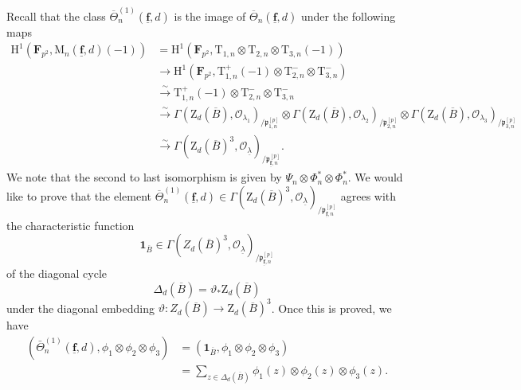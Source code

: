 \documentclass[10pt]{amsart}
\numberwithin{equation}{section}
\theoremstyle{plain}
\numberwithin{equation}{section}
\theoremstyle{definition}
\theoremstyle{remark}
\def\undlamb{\underline{\lambda}}
\def\triplef{\underline{\mathbf{f}}}
\def\triplepnp {{\frakp}^{[p]}_{\triplef, n}}
\def\calO{\mathcal{O}}
\def\frakp{\mathfrak{p}}
\def\FF{\mathbf{F}}
\def\rmH{\mathrm{H}}
\def\rmM{\mathrm{M}}
\def\rmT{\mathrm{T}}
\def\rmZ{\mathrm{Z}}
\begin{document}
Recall that the class  $\overline{\Theta}^{(1)}_{n}(\triplef, d)$ is the image of $\overline{\Theta}_{n}(\triplef, d)$ under the following maps 
\begin{equation*}
\begin{aligned}
\rmH^{1}(\FF_{p^{2}}, \rmM_{n}(\triplef, d)(-1))&= \rmH^{1}(\FF_{p^{2}}, \rmT_{1, n}\otimes\rmT_{2, n}\otimes \rmT_{3, n}(-1))\\
&\rightarrow\rmH^{1}(\FF_{p^{2}},\rmT^{+}_{1, n}(-1)\otimes \rmT^{-}_{2, n}\otimes\rmT^{-}_{3, n}) \\
&\xrightarrow{\sim} \rmT^{+}_{1, n}(-1)\otimes \rmT^{-}_{2, n}\otimes\rmT^{-}_{3, n} \\
&\xrightarrow{\sim}\Gamma(\rmZ_{d}(\overline{B}),\calO_{\lambda_{1}})_{/\frakp^{[p]}_{1, n}}\otimes \Gamma(\rmZ_{d}(\overline{B}),\calO_{\lambda_{2}})_{/\frakp^{[p]}_{2, n}}\otimes \Gamma(\rmZ_{d}(\overline{B}),\calO_{\lambda_{3}})_{/\frakp^{[p]}_{3, n}}\\
&\xrightarrow{\sim}\Gamma(\rmZ_{d}(\overline{B})^{3}, \calO_{\undlamb})_{/\triplepnp}.
\end{aligned}
\end{equation*}
We note that the second to last isomorphism is given by $\Psi_{n}\otimes\Phi^{\ast}_{n}\otimes\Phi^{\ast}_{n}$.
We would like to prove that the element $\overline{\Theta}^{(1)}_{n}(\triplef, d)\in \Gamma(\rmZ_{d}(\overline{B})^{3}, \calO_{\undlamb})_{/\frakp^{[p]}_{\triplef,n}}$ agrees with the characteristic function 
\begin{equation*}
\mathbf{1}_{\overline{B}}\in \Gamma(Z_{d}(\overline{B})^{3}, \calO_{\undlamb})_{/\triplepnp} 
\end{equation*}
of the diagonal cycle 
\begin{equation}\label{def-diagonal}
\Delta_{d}(\overline{B})=\vartheta_{\ast}\rmZ_{d}(\overline{B}) 
\end{equation}
under the diagonal embedding $\vartheta:Z_{d}(\overline{B})\rightarrow \rmZ_{d}(\overline{B})^{3}$.  Once this is proved, we have
\begin{equation*}
\begin{aligned}
(\bar{\Theta}^{(1)}_{n}(\triplef, d), \phi_{1}\otimes\phi_{2}\otimes\phi_{3})&=(\mathbf{1}_{\overline{B}}, \phi_{1}\otimes\phi_{2}\otimes\phi_{3})\\
&=\sum_{z\in \Delta_{d}(\overline{B})} \phi_{1}(z)\otimes \phi_{2}(z)\otimes \phi_{3}(z).\\
\end{aligned}
\end{equation*} 
\end{document}
